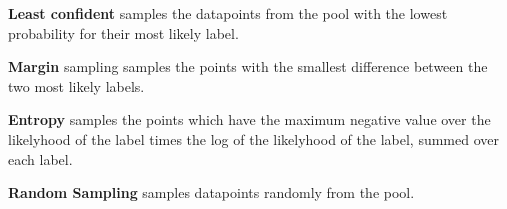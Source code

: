 \documentclass[12pt,fleqn]{article}
\begin{document}
\begin{multicols}{2}
		\begin{compactitem}
			\item \textbf{Least confident} samples the datapoints from the pool with the lowest probability for their most likely label.
			\item \textbf{Margin} sampling samples the points with the smallest difference between the two most likely labels.
			\item \textbf{Entropy} samples the points which have the maximum negative value over the likelyhood of the label times the log of the likelyhood of the label, summed over each label.
			\item \textbf{Random Sampling} samples datapoints randomly from the pool.
		\end{compactitem}
		 
	\end{multicols}		
\end{document}
